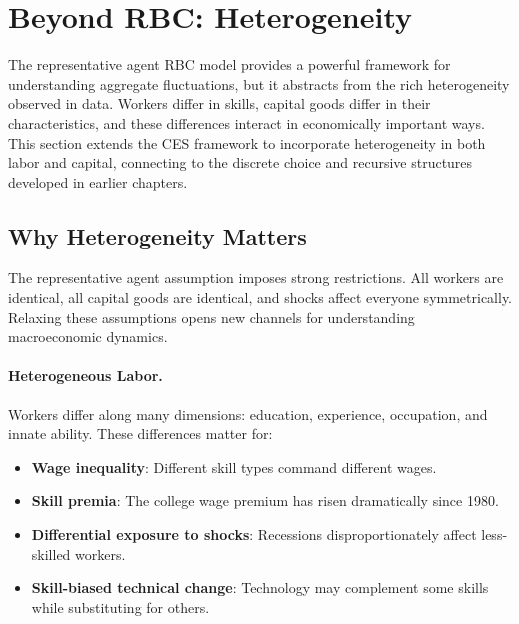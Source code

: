 \section{Beyond RBC: Heterogeneity}
\label{sec:beyond-rbc}

The representative agent RBC model provides a powerful framework for understanding aggregate fluctuations, but it abstracts from the rich heterogeneity observed in data. Workers differ in skills, capital goods differ in their characteristics, and these differences interact in economically important ways. This section extends the CES framework to incorporate heterogeneity in both labor and capital, connecting to the discrete choice and recursive structures developed in earlier chapters.

\subsection{Why Heterogeneity Matters}
\label{subsec:why-heterogeneity}

The representative agent assumption imposes strong restrictions. All workers are identical, all capital goods are identical, and shocks affect everyone symmetrically. Relaxing these assumptions opens new channels for understanding macroeconomic dynamics.

\paragraph{Heterogeneous Labor.}
Workers differ along many dimensions: education, experience, occupation, and innate ability. These differences matter for:
\begin{itemize}[nosep]
\item \textbf{Wage inequality}: Different skill types command different wages.
\item \textbf{Skill premia}: The college wage premium has risen dramatically since 1980.
\item \textbf{Differential exposure to shocks}: Recessions disproportionately affect less-skilled workers.
\item \textbf{Skill-biased technical change}: Technology may complement some skills while substituting for others.
\end{itemize}

